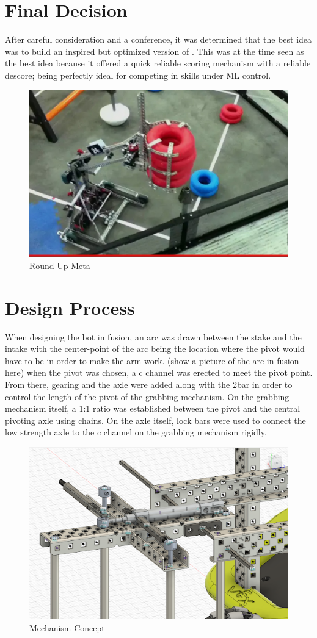 \section*{Final Decision} 
After careful consideration and a conference, it was determined that the best idea was to build an inspired but optimized version of . This was at the time seen as the best idea because it offered a quick reliable scoring mechanism with a reliable descore; being perfectly ideal for competing in skills under ML control.
\begin{figure}[!ht]
    \centering
    \includegraphics[width=0.5\linewidth]{images/RoundUp.jpeg}
    \caption{Round Up Meta}
    \label{fig:round-up}
\end{figure}
\section*{Design Process}
When designing the bot in fusion, an arc was drawn between the stake and the intake with the center-point of the arc being the location where the pivot would have to be in order to make the arm work. (show a picture of the arc in fusion here) when the pivot was chosen, a c channel was erected to meet the pivot point. From there, gearing and the axle were added along with the 2bar in order to control the length of the pivot of the grabbing mechanism. On the grabbing mechanism itself, a 1:1 ratio was established between the pivot and the central pivoting axle using chains. On the axle itself, lock bars were used to connect the low strength axle to the c channel on the grabbing mechanism rigidly. 
\begin{figure} [h!]
    \centering
    \includegraphics[width=0.5\linewidth]{images/Bot Idea One.png}
    \caption{Mechanism Concept}
    \label{fig:bot-idea-one}
\end{figure} 
